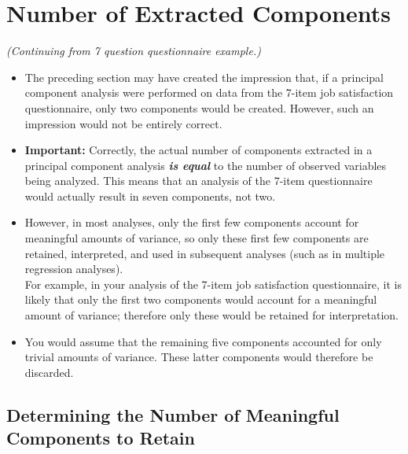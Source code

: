 \documentclass[a4paper,12pt]{article}
\begin{document}
\section{Number of Extracted Components }
\textit{(Continuing from 7 question questionnaire example.)}
\begin{itemize}
	\item The preceding section may have created the impression
	that, if a principal component analysis were performed on data from the 7-item job satisfaction
	questionnaire, only two components would be created.  However, such an impression would not
	be entirely correct.
	
	\item \textbf{Important:} Correctly, the actual number of components extracted in a principal component analysis \textbf{\emph{is equal}} to the
	number of observed variables being analyzed.  This means that an analysis of the 7-item
	questionnaire would actually result in seven components, not two.
	
	\item 	However, in most analyses, only the first few components account for meaningful amounts of
	variance, so only these first few components are retained, interpreted, and used in subsequent
	analyses (such as in multiple regression analyses).  \\ For example, in your analysis of the 7-item
	job satisfaction questionnaire, it is likely that only the first two components would account for a
	meaningful amount of variance; therefore only these would be retained for interpretation.
	\item  You
	would assume that the remaining five components accounted for only trivial amounts of
	variance.  These latter components would therefore be discarded.
\end{itemize}

\subsection{Determining the Number of Meaningful Components to Retain}
\end{document}
